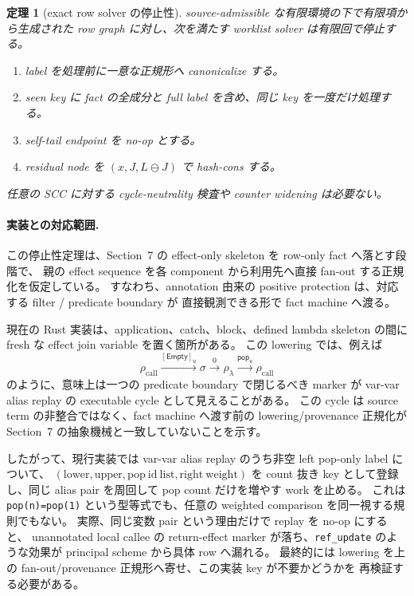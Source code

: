 \documentclass[uplatex,dvipdfmx,a4paper,10.5pt]{jsarticle}
\theoremstyle{jpplain}
\newtheorem{theorem}[definition]{定理}
\newcommand{\Empty}{\mathsf{Empty}}
\newcommand{\takeop}[2]{[#1]_{#2}}
\newcommand{\popop}[1]{\mathsf{pop}_{#1}}
\begin{document}
\begin{theorem}[exact row solver の停止性]\label{thm:row-solver-termination}
source-admissible な有限環境の下で有限項から生成された row graph に対し、次を満たす worklist solver は有限回で停止する。
\begin{enumerate}
  \item label を処理前に一意な正規形へ canonicalize する。
  \item seen key に fact の全成分と full label を含め、同じ key を一度だけ処理する。
  \item self-tail endpoint を no-op とする。
  \item residual node を $(x,J,L\ominus J)$ で hash-cons する。
\end{enumerate}
任意の SCC に対する cycle-neutrality 検査や counter widening は必要ない。
\end{theorem}

\paragraph{実装との対応範囲.}
この停止性定理は、Section~7 の effect-only skeleton を row-only fact へ落とす段階で、
親の effect sequence を各 component から利用先へ直接 fan-out する正規化を仮定している。
すなわち、annotation 由来の positive protection は、対応する filter / predicate boundary が
直接観測できる形で fact machine へ渡る。

現在の Rust 実装は、application、catch、block、defined lambda skeleton の間に
fresh な effect join variable を置く箇所がある。
この lowering では、例えば
\[
  \rho_{\mathrm{call}}
    \xrightarrow{\takeop{\Empty}{u}}
  \sigma
    \xrightarrow{0}
  \rho_{\lambda}
    \xrightarrow{\popop{u}}
  \rho_{\mathrm{call}}
\]
のように、意味上は一つの predicate boundary で閉じるべき marker が
var-var alias replay の executable cycle として見えることがある。
この cycle は source term の非整合ではなく、fact machine へ渡す前の lowering/provenance 正規化が
Section~7 の抽象機械と一致していないことを示す。

したがって、現行実装では var-var alias replay のうち非空 left pop-only label について、
$(\mathrm{lower},\mathrm{upper},\mathrm{pop\ id\ list},\mathrm{right\ weight})$ を
count 抜き key として登録し、同じ alias pair を周回して pop count だけを増やす work を止める。
これは \texttt{pop(n)=pop(1)} という型等式でも、任意の weighted comparison を同一視する規則でもない。
実際、同じ変数 pair という理由だけで replay を no-op にすると、
unannotated local callee の return-effect marker が落ち、\texttt{ref\_update} のような効果が
principal scheme から具体 row へ漏れる。
最終的には lowering を上の fan-out/provenance 正規形へ寄せ、この実装 key が不要かどうかを
再検証する必要がある。
\end{document}
